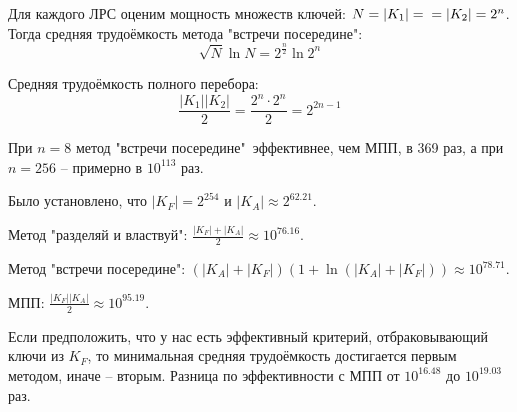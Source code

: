 Для каждого ЛРС оценим мощность множеств ключей: $N = |K_1| = \\ = |K_2| = 2^n$.
Тогда средняя трудоёмкость метода "встречи посередине":
$$\sqrt N \ln N = 2^{\frac{n}{2}} \ln 2^{n}$$

\noindent Средняя трудоёмкость полного перебора: 
$$\frac{|K_1||K_2|}{2} = \frac{2^{n} \cdot 2^{n}}{2} = 2^{2n-1}$$

При $n = 8$ метод "встречи посередине"\ эффективнее, чем МПП, в 369 раз, а при $n = 256$ -- примерно в $10^{113}$ раз.


\noindent Было установлено, что $|K_F| = 2^{254}$ и $|K_A| \approx 2^{62.21}$.

\noindent Метод "разделяй и властвуй": $\frac{|K_F| + |K_A|}{2} \approx 10 ^ {76.16}$.

\noindent Метод "встречи посередине": $(|K_A| + |K_F|)(1 + \ln(|K_A| + |K_F|)) \approx 10 ^ {78.71} $.

\noindent МПП: $\frac{|K_F||K_A|}{2} \approx 10 ^ {95.19}$.

\noindent Если предположить, что у нас есть эффективный критерий, отбраковывающий ключи из $K_F$, то минимальная средняя трудоёмкость достигается первым методом, иначе -- вторым. Разница по эффективности с МПП от $10 ^ {16.48}$ до $10 ^ {19.03}$ раз.